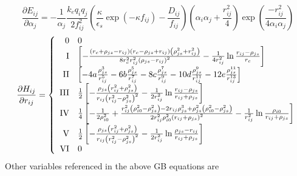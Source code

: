 \begin{equation}
\frac{\partial E_{ij}}{\partial \alpha_j} = -\frac{1}{\alpha_j}\frac{k_e q_i q_j}{2 f_{ij}^2}\left( \frac{\kappa}{\epsilon_s}\exp{\left(-\kappa f_{ij}\right)} - \frac{D_{ij}}{f_{ij}}\right)
\left(\alpha_i\alpha_j + \frac{r_{ij}^2}{4}\right)\exp{\left(\frac{-r_{ij}^2}{4 \alpha_i \alpha_j}\right)}
\end{equation}
\begin{equation}
\frac{\partial H_{ij}}{\partial r_{ij}} = \left\{
\begin{array}{r l}
\textrm{0} & 0 \\
\textrm{I} &
\left[-\frac{\left(r_c+\rho_{js}-r_{ij}\right)\left(r_c-\rho_{js}+r_{ij}\right)\left(\rho_{js}^2+r_{ij}^2\right)}{8r_c^2r_{ij}^2\left(\rho_{js}-r_{ij}\right)^2}
-\frac{1}{4r_{ij}^2}\ln \frac{r_{ij}-\rho_{js}}{r_c}
\right] \\
\textrm{II} &
\left[
-4a\frac{\rho_{js}^3}{r_{ij}^5}
-6b\frac{\rho_{js}^5}{r_{ij}^7}
-8c\frac{\rho_{js}^7}{r_{ij}^9}
-10d\frac{\rho_{js}^9}{r_{ij}^{11}}
-12e\frac{\rho_{js}^{11}}{r_{ij}^{13}}
\right] \\
\textrm{III} &
\frac{1}{2}\left[
-\frac{\rho_{js}\left(r_{ij}^2+\rho_{js}^2\right)}{r_{ij}\left(r_{ij}^2-\rho_{js}^2\right)^2}
-\frac{1}{2r_{ij}^2} \ln \frac{r_{ij}-\rho_{js}}{r_{ij}+\rho_{js}}
\right] \\
\textrm{IV} &
\frac{1}{4} \left[
-\frac{1}{2\rho_{i0}^2}
+\frac{r_{ij}^2\left(\rho_{i0}^2-\rho_{js}^2\right)-2 r_{ij}\rho_{js}^3+\rho_{js}^2\left(\rho_{i0}^2-\rho_{js}^2\right)}{2r_{ij}^2\rho_{i0}^2\left(r_{ij}+\rho_{js}\right)^2}
-\frac{1}{r_{ij}^2}\ln\frac{\rho_{i0}}{r_{ij}+\rho_{js}}
\right] \\
\textrm{V} &
\frac{1}{2}\left[
-\frac{\rho_{js}\left(r_{ij}^2+\rho_{js}^2\right)}{r_{ij}\left(r_{ij}^2-\rho_{js}^2\right)^2}
-\frac{1}{2r_{ij}^2} \ln \frac{\rho_{js}-r_{ij}}{r_{ij}+\rho_{js}}
\right] \\
\textrm{VI} & 0
\end{array}
\right.
\end{equation}
Other variables referenced in the above GB equations are
